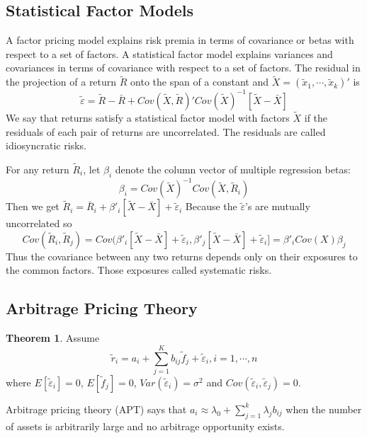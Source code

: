 \documentclass[11pt, a4paper, oneside]{article}
\theoremstyle{definition}
\theoremstyle{proposition}
\theoremstyle{corollary}
\theoremstyle{lemma}
\newtheorem{myt}{Theorem}
\theoremstyle{theorem}
\begin{document}
 
 \subsection{Statistical Factor Models} 
 A factor pricing model explains risk premia in terms of covariance or betas with respect to a set of factors. A statistical factor model explains variances and covariances in terms of covariance with respect to a set of factors. The residual in the projection of a return $\tilde{R}$ onto the span of a constant and $\tilde{X} = (\tilde{x}_1, \cdots, \tilde{x}_k)'$ is 
 $$\tilde{\varepsilon} = \tilde{R} - \bar{R} + Cov(\tilde{X}, \tilde{R})'Cov(\tilde{X})^{-1}[\tilde{X} - \bar{X}]$$
 We say that returns satisfy a statistical factor model with factors $\tilde{X}$ if the residuals of each pair of returns are uncorrelated. The residuals are called idiosyncratic risks. 

For any return $\tilde{R}_i$, let $\beta_i$ denote the column vector of multiple regression betas:
$$\beta_i = Cov(\tilde{X})^{-1}Cov(\tilde{X}, \tilde{R}_i)$$
Then we get $\tilde{R}_i = \bar{R}_i + \beta'_i[\tilde{X} - \bar{X}] + \tilde{\varepsilon}_i$ Because the $\tilde{\varepsilon}$'s are mutually uncorrelated so $$Cov(\tilde{R}_i, \tilde{R}_j) = Cov(\beta'_i[\tilde{X} - \bar{X}] + \tilde{\varepsilon}_i, \beta'_j[\tilde{X} -\bar{X}] + \tilde{\varepsilon}_i] = \beta'_iCov(X)\beta_j$$
Thus the covariance between any two returns depends only on their exposures to the common factors. Those exposures called systematic risks. 

\subsection{Arbitrage Pricing Theory}
\begin{myt}
Assume 
\[
\tilde{r}_i = a_i + \sum_{j=1}^K b_{ij}\tilde{f}_j + \tilde{\varepsilon}_i, i=1, \cdots, n
\] 
where $E[\tilde{\varepsilon}_i] = 0$, $E[\tilde{f}_j] = 0$, $Var(\tilde{\varepsilon}_i) = \sigma^2$ and $Cov(\tilde{\varepsilon}_i, \tilde{\varepsilon}_j) = 0$.

Arbitrage pricing theory (APT) says that $a_i \approx \lambda_{0} + \sum_{j=1}^k \lambda_{j} b_{ij}$ when the number of assets is arbitrarily large and no arbitrage opportunity exists.

\end{myt}
\end{document}
